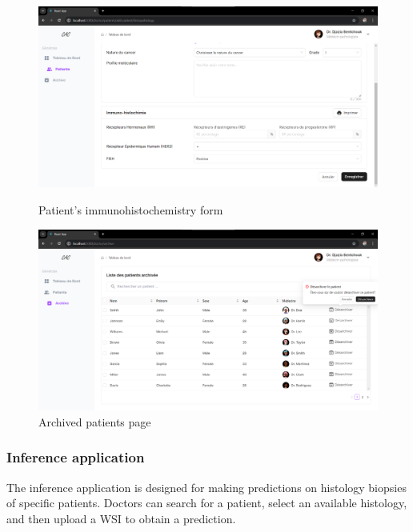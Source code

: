 \documentclass[
11pt, %
english, %
singlespacing, %
headsepline, %
]{project_structure}
\begin{document}
\begin{figure}[H]
    \centering
    \begin{minipage}{0.49\textwidth}
        \centering
        \includegraphics[width=1\linewidth]{figures/SI/web/immuno.png}
        \caption{Patient's immunohistochemistry form}
        \label{fig:immuno}
        
    \end{minipage}
    \hfill
    \begin{minipage}{0.49\textwidth}
        \centering
        \includegraphics[width=1\linewidth]{figures/SI/web/archive.png}
        \caption{Archived patients page}
        \label{fig:archive}
    \end{minipage}
\end{figure}

\subsubsection{Inference application}
The inference application is designed for making predictions on histology biopsies of specific patients. Doctors can search for a patient, select an available histology, and then upload a WSI to obtain a prediction.
\end{document}
